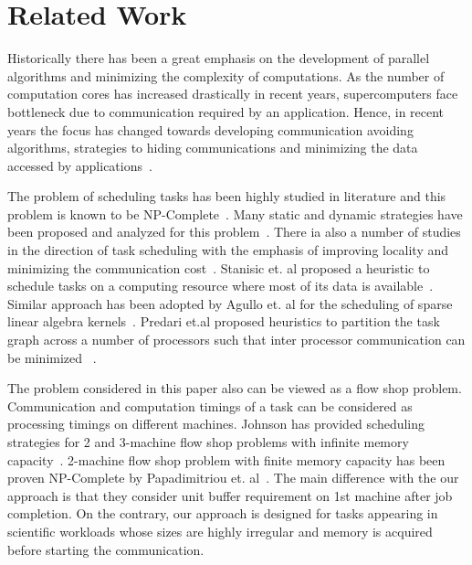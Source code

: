 \documentclass[runningheads]{llncs} %
\begin{document}
\section{Related Work}



Historically there has been a great emphasis on the development of parallel algorithms and minimizing the complexity of computations. As the number of computation cores has increased drastically in recent years, supercomputers face bottleneck due to communication required by an application. Hence, in recent years the focus has changed towards developing communication avoiding algorithms, strategies to hiding communications and  minimizing the data accessed by applications~\cite{yelick2016}. 

  
The problem of scheduling tasks has been highly studied in literature and this problem is known to be NP-Complete~\cite{GareyJohnson}.  Many static and dynamic strategies have been proposed and analyzed for this problem~\cite{heft-Topcuoglu,hipc16multiresource,ipdps16starpu}. There ia also a number of studies in the direction of task scheduling with the emphasis of improving locality and minimizing the communication cost~\cite{starpu,heft-Topcuoglu}. Stanisic et. al proposed a heuristic to schedule tasks on a computing resource where most of its data is available~\cite{luka-dmdar}. Similar approach has been adopted by Agullo et. al for the scheduling of sparse linear algebra kernels~\cite{agullo_fmm}.  Predari et.al  proposed  heuristics to  partition the task graph across a number of processors such that inter processor communication can be minimized ~\cite{predari:tel-01518956}.

The problem considered in this paper also can be viewed as a flow shop problem. Communication and computation timings of a task can be considered as processing timings on different machines.  Johnson has provided scheduling strategies for 2 and 3-machine flow shop problems with infinite memory capacity~\cite{johnson}. 2-machine flow shop problem with finite memory capacity has been proven NP-Complete by Papadimitriou et. al~\cite{Papadimitriou:1980:FSL:322203.322213}. The main difference with the our approach is that they consider unit buffer requirement on 1st machine after job completion. On the contrary, our approach is designed for tasks appearing in scientific workloads whose sizes are highly irregular and memory is acquired before starting the communication.
\end{document}
